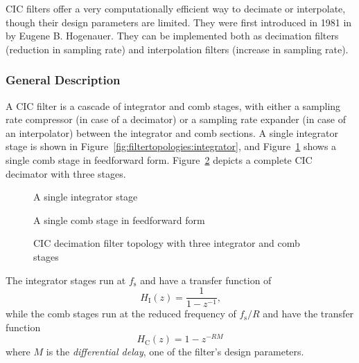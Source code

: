 CIC  filters  offer  a  very  computationally efficient  way  to  decimate  or
interpolate,  though their  design parameters  are limited.   They were  first
introduced  in 1981  in  \cite{1163535} by  Eugene  B. Hogenauer. They can  be
implemented  both  as decimation  filters  (reduction  in sampling  rate)  and
interpolation filters (increase in sampling rate).

\subsubsection{General Description}
\label{subsubsec:cic:general_description}

A   CIC  filter   is  a   cascade  of   integrator  and   comb  stages,   with
either   a   sampling    rate   compressor   (in   case    of   a   decimator)
or   a    sampling   rate    expander   (in    case   of    an   interpolator)
between   the   integrator   and   comb   sections.    A   single   integrator
stage   is   shown    in   Figure~\ref{fig:filtertopologies:integrator},   and
Figure~\ref{fig:filtertopologies:comb}   shows   a   single  comb   stage   in
feedforward form. Figure~\ref{fig:filtertopologies:cic} depicts a complete CIC
decimator with three stages.

\begin{figure}
    \centering
    \begin{minipage}[t][][b]{0.45\textwidth}
        \centering
        
        \caption[Integrator Stage]{A single integrator stage}
        \label{fig:filtertopologies:integrator}
    \end{minipage}
    \begin{minipage}[t][][b]{0.45\textwidth}
        \centering
        
        \caption[Comb Stage]{A single comb stage in feedforward form}
        \label{fig:filtertopologies:comb}
    \end{minipage}
\end{figure}

\begin{figure}
    \centering
    
    \caption[CIC Filter Topology]
        {CIC decimation filter topology with three integrator and comb stages}
    \label{fig:filtertopologies:cic}
\end{figure}

The integrator stages run at $f_\mathrm{s}$ and have a transfer function of
\begin{equation}
    \label{eq:cic:integrator_stage}
    H_\mathrm{I}(z) = \frac{1}{1-z^{-1}}\text{,}
\end{equation}
while the  comb stages run  at the  reduced frequency of  $f_\mathrm{s}/R$ and
have the transfer function
\begin{equation}
    \label{eq:cic:comb_stage}
    H_\mathrm{C}(z) = 1 - z^{-RM}
\end{equation}
where  $M$  is the  \emph{differential  delay},  one  of the  filter's  design
parameters.

